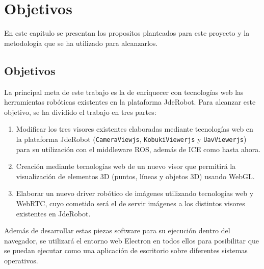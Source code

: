 \chapter{Objetivos}\label{cap.objetivos}
En este capitulo se presentan los propositos planteados para este proyecto y la metodología que se ha utilizado para alcanzarlos.

\section{Objetivos}
La principal meta de este trabajo es la de enriquecer con tecnologías web las herramientas robóticas existentes en la plataforma JdeRobot. Para alcanzar este objetivo, se ha dividido el trabajo en tres partes: 
\begin{enumerate}
\item Modificar los tres visores existentes elaboradas mediante tecnologías web en la plataforma JdeRobot (\texttt{CameraViewjs}, \texttt{KobukiViewerjs} y \texttt{UavViewerjs}) para su utilización con el middleware ROS, además de ICE como hasta ahora. 
\item Creación mediante tecnologías web de un nuevo visor que permitirá la visualización de elementos 3D (puntos, líneas y objetos 3D) usando WebGL.
\item Elaborar un nuevo driver robótico de imágenes utilizando tecnologías web y WebRTC, cuyo cometido será el de servir imágenes a los distintos visores existentes en JdeRobot.
\end{enumerate}
Además de desarrollar estas piezas software para su ejecución dentro del navegador, se utilizará el entorno web Electron en todos ellos para posibilitar que se puedan ejecutar como una aplicación de escritorio sobre diferentes sistemas operativos.

